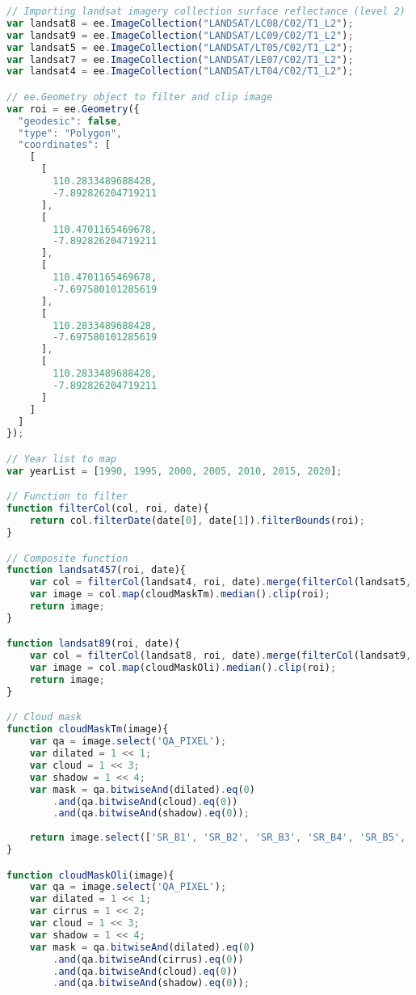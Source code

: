 \begin{lstlisting}[language=JavaScript, label={code:expansion}, caption={GEE Script to Model Urban Expansion}]
// Importing landsat imagery collection surface reflectance (level 2)
var landsat8 = ee.ImageCollection("LANDSAT/LC08/C02/T1_L2");
var landsat9 = ee.ImageCollection("LANDSAT/LC09/C02/T1_L2");
var landsat5 = ee.ImageCollection("LANDSAT/LT05/C02/T1_L2");
var landsat7 = ee.ImageCollection("LANDSAT/LE07/C02/T1_L2");
var landsat4 = ee.ImageCollection("LANDSAT/LT04/C02/T1_L2");

// ee.Geometry object to filter and clip image
var roi = ee.Geometry({
  "geodesic": false,
  "type": "Polygon",
  "coordinates": [
    [
      [
        110.2833489688428,
        -7.892826204719211
      ],
      [
        110.4701165469678,
        -7.892826204719211
      ],
      [
        110.4701165469678,
        -7.697580101285619
      ],
      [
        110.2833489688428,
        -7.697580101285619
      ],
      [
        110.2833489688428,
        -7.892826204719211
      ]
    ]
  ]
});

// Year list to map
var yearList = [1990, 1995, 2000, 2005, 2010, 2015, 2020];

// Function to filter
function filterCol(col, roi, date){
	return col.filterDate(date[0], date[1]).filterBounds(roi);
}

// Composite function
function landsat457(roi, date){
	var col = filterCol(landsat4, roi, date).merge(filterCol(landsat5, roi, date)).merge(filterCol(landsat7, roi, date));
	var image = col.map(cloudMaskTm).median().clip(roi);
	return image;
}

function landsat89(roi, date){
	var col = filterCol(landsat8, roi, date).merge(filterCol(landsat9, roi, date));
	var image = col.map(cloudMaskOli).median().clip(roi);
	return image;
}

// Cloud mask
function cloudMaskTm(image){
	var qa = image.select('QA_PIXEL');
	var dilated = 1 << 1;
	var cloud = 1 << 3;
	var shadow = 1 << 4;
	var mask = qa.bitwiseAnd(dilated).eq(0)
		.and(qa.bitwiseAnd(cloud).eq(0))
		.and(qa.bitwiseAnd(shadow).eq(0));
	
	return image.select(['SR_B1', 'SR_B2', 'SR_B3', 'SR_B4', 'SR_B5', 'SR_B7'], ['B2', 'B3', 'B4', 'B5', 'B6', 'B7']).updateMask(mask);
}

function cloudMaskOli(image){
	var qa = image.select('QA_PIXEL');
	var dilated = 1 << 1;
	var cirrus = 1 << 2;
	var cloud = 1 << 3;
	var shadow = 1 << 4;
	var mask = qa.bitwiseAnd(dilated).eq(0)
		.and(qa.bitwiseAnd(cirrus).eq(0))
		.and(qa.bitwiseAnd(cloud).eq(0))
		.and(qa.bitwiseAnd(shadow).eq(0));
	

\end{lstlisting}
